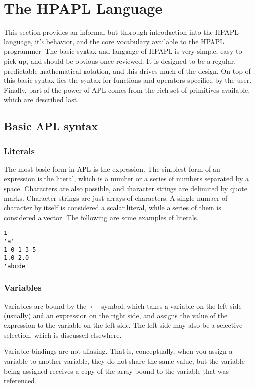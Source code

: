 \section{The HPAPL Language}

This section provides an informal but thorough introduction into the HPAPL 
language, it's behavior, and the core vocabulary available to the HPAPL 
programmer. The basic syntax and language of HPAPL is very simple, easy 
to pick up, and should be obvious once reviewed. It is designed to be a 
regular, predictable mathematical notation, and this drives much of the 
design. On top of this basic syntax lies the syntax for functions and 
operators specified by the user. Finally, part of the power of APL comes 
from the rich set of primitives available, which are described last.

\subsection{Basic APL syntax}

\subsubsection{Literals}

The most basic form in APL is the expression. The simplest form of an 
expression is the literal, which is a number or a series of numbers 
separated by a space. Characters are also possible, and character strings 
are delimited by quote marks. Character strings are just arrays of characters.
A single number of character by itself is considered a scalar literal, 
while a series of them is considered a vector. The following are some 
examples of literals.

\begin{verbatim}
1   
'a'
1 0 1 3 5
1.0 2.0
'abcde'
\end{verbatim}

\subsubsection{Variables}

Variables are bound by the $\gets$ symbol, which takes a variable on 
the left side (usually) and an expression on the right side, and assigns 
the value of the expression to the variable on the left side. The left 
side may also be a selective selection, which is discussed elsewhere.

Variable bindings are not aliasing. That is, conceptually, when you assign 
a variable to another variable, they do not share the same value, but 
the variable being assigned receives a copy of the array bound to the 
variable that was referenced. 

